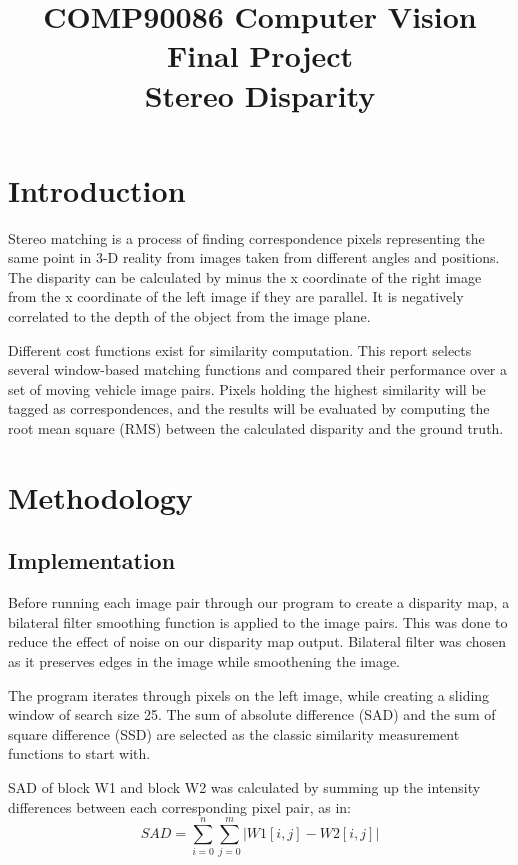 \documentclass[conference]{IEEEtran}
\begin{document}
\title{COMP90086 Computer Vision Final Project\\
Stereo Disparity
}
\author{
\and
{}
}
\maketitle
\section{Introduction}
Stereo matching is a process of finding correspondence pixels representing the same point in 3-D reality from images taken from different angles and positions. The disparity can be calculated by minus the x coordinate of the right image from the x coordinate of the left image if they are parallel. It is negatively correlated to the depth of the object from the image plane.

Different cost functions exist for similarity computation. This report selects several window-based matching functions and compared their performance over a set of moving vehicle image pairs. Pixels holding the highest similarity will be tagged as correspondences, and the results will be evaluated by computing the root mean square (RMS) between the calculated disparity and the ground truth.
\section{Methodology}
\subsection{Implementation}
Before running each image pair through our program to create a disparity map, a bilateral filter smoothing function is applied to the image pairs. This was done to reduce the effect of noise on our disparity map output. Bilateral filter was chosen as it preserves edges in the image while smoothening the image.

The program iterates through pixels on the left image, while creating a sliding window of search size 25. The sum of absolute difference (SAD) and the sum of square difference (SSD) are selected as the classic similarity measurement functions to start with.

SAD of block W1 and block W2 was calculated by summing up the intensity differences between each corresponding pixel pair, as in:
\begin{equation*}
    SAD=\sum^{n}_{i=0}\sum^{m}_{j=0}|W1[i,j]-W2[i,j]|
\end{equation*}
\end{document}

